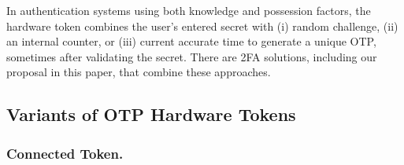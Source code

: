 In authentication systems using both knowledge and possession factors, the hardware token combines the user's entered secret with  (i) random challenge, (ii) an internal counter, or (iii) current accurate time to generate a unique OTP, sometimes after validating the secret. There are 2FA solutions, including our proposal in this paper, that combine these approaches.


%
%
%
%
%
%
%
%
%
%
%
%



\subsection{Variants of OTP Hardware Tokens}

\subsubsection{Connected Token.}


